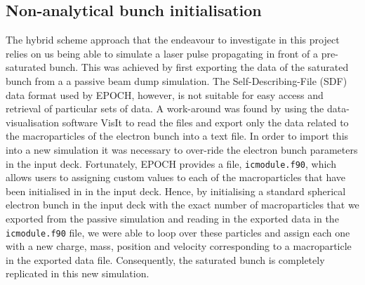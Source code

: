 

\subsection{Non-analytical bunch initialisation}
\label{Nonanalytical}
The hybrid scheme approach that the endeavour to investigate in this project relies on us being able to simulate a laser pulse propagating in front of a pre-saturated bunch. 
This was achieved by first exporting the data of the saturated bunch from a a passive beam dump simulation. The Self-Describing-File (SDF) data format used by EPOCH, however, is not suitable for easy access and retrieval of particular sets of data. A work-around was found by using the data-visualisation software VisIt \cite{LANL2005} to read the files and export only the data related to the macroparticles of the electron bunch into a text file. In order to import this into a new simulation it was necessary to over-ride the electron bunch parameters in the input deck. Fortunately, EPOCH provides a file, \texttt{icmodule.f90}, which allows users to assigning custom values to each of the macroparticles that have been initialised in in the input deck. Hence, by initialising a standard spherical electron bunch in the input deck with the exact number of macroparticles that we exported from the passive simulation and reading in the exported data in the \texttt{icmodule.f90} file, we were able to loop over these particles and assign each one with a new charge, mass, position and velocity corresponding to a macroparticle in the exported data file. Consequently, the saturated bunch is completely replicated in this new simulation. 


